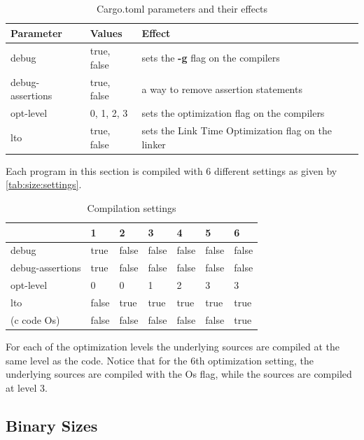 \begin{table}[H]
  \centering
  \begin{tabular}{l|l|l}

    \textbf{Parameter} & \textbf{Values} & \textbf{Effect} \\
    \hline
    debug & true, false & sets the \textbf{-g} flag on the compilers  \\
    debug-assertions & true, false & a way to remove assertion statements \\
    opt-level & 0, 1, 2, 3 & sets the optimization flag on the compilers \\
    lto & true, false & sets the Link Time Optimization flag on the linker \\
    \hline
  \end{tabular}
  \caption{Cargo.toml parameters and their effects}
  \label{tab:size:params}
\end{table}

Each program in this section is compiled with 6 different settings as given by \autoref{tab:size:settings}.
\begin{table}[H]
  \centering
  \begin{tabular}{l|l|l|l|l|l|l}
    & \textbf{1} & \textbf{2} & \textbf{3} & \textbf{4} & \textbf{5} & \textbf{6} \\
    \hline
    debug            & true  & false & false & false & false & false \\
    debug-assertions & true  & false & false & false & false & false \\
    opt-level        & 0     & 0     & 1     & 2     & 3     & 3     \\
    lto              & false & true  & true  & true  & true  & true  \\
    (c code Os)      & false & false & false & false & false & true \\
    \hline
  \end{tabular}
  \caption{Compilation settings}
  \label{tab:size:settings}
\end{table}

For each of the optimization levels the underlying {\C} sources are compiled at the same level as the {\rust} code.
Notice that for the 6th optimization setting, the underlying {\C} sources are compiled with the Os flag, while the {\rust} sources are compiled at level 3.

\subsection{Binary Sizes}

